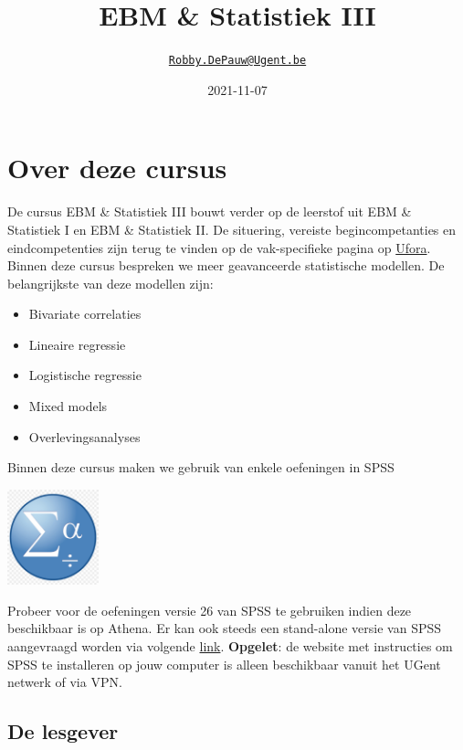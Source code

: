 \documentclass[
]{book}
\title{EBM \& Statistiek III}
\author{\href{mailto:Robby.DePauw@Ugent.be}{\nolinkurl{Robby.DePauw@Ugent.be}}}
\date{2021-11-07}
\providecommand{\tightlist}{%
  \setlength{\itemsep}{0pt}\setlength{\parskip}{0pt}}
\theoremstyle{definition}
\theoremstyle{definition}
\theoremstyle{definition}
\theoremstyle{definition}
\theoremstyle{remark}
\begin{document}
\maketitle

{
\setcounter{tocdepth}{2}
\tableofcontents
}
\hypertarget{over-deze-cursus}{%
\chapter*{Over deze cursus}\label{over-deze-cursus}}


De cursus {EBM \& Statistiek III} bouwt verder op de leerstof uit {EBM \& Statistiek I} en {EBM \& Statistiek II}. De situering, vereiste begincompetanties en eindcompetenties zijn terug te vinden op de vak-specifieke pagina op \href{https://ufora.ugent.be}{Ufora}. Binnen deze cursus bespreken we meer geavanceerde statistische modellen. De belangrijkste van deze modellen zijn:

\begin{itemize}
\tightlist
\item
  Bivariate correlaties
\item
  Lineaire regressie
\item
  Logistische regressie
\item
  Mixed models
\item
  Overlevingsanalyses
\end{itemize}

Binnen deze cursus maken we gebruik van enkele oefeningen in {SPSS}

\includegraphics[width=1.04167in,height=\textheight]{img/spss.png}

Probeer voor de oefeningen versie 26 van {SPSS} te gebruiken indien deze beschikbaar is op Athena. Er kan ook steeds een stand-alone versie van {SPSS} aangevraagd worden via volgende \href{https://helpdesk.ugent.be/athena/}{link}. \textbf{Opgelet}: de website met instructies om {SPSS} te installeren op jouw computer is alleen beschikbaar vanuit het UGent netwerk of via VPN.

\hypertarget{de-lesgever}{%
\section*{De lesgever}\label{de-lesgever}}
\end{document}
